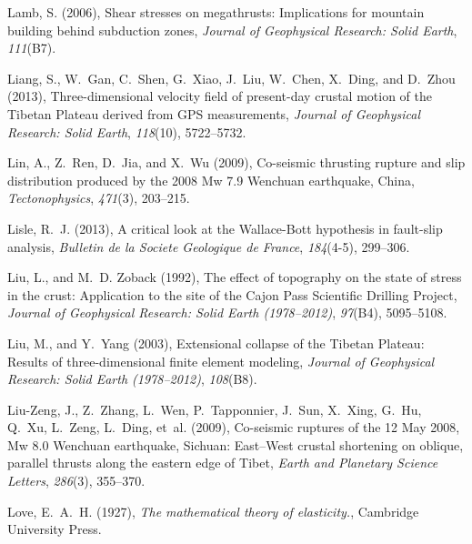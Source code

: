 \documentclass[draft,jgrga]{AGUTeX}
\begin{document}
\begin{article}
\begin{thebibliography}{90}
Lamb, S. (2006), Shear stresses on megathrusts: {I}mplications for mountain
  building behind subduction zones, \textit{Journal of Geophysical Research:
  Solid Earth}, \textit{111}(B7).

Liang, S., W.~Gan, C.~Shen, G.~Xiao, J.~Liu, W.~Chen, X.~Ding, and D.~Zhou
  (2013), Three-dimensional velocity field of present-day crustal motion of the
  {T}ibetan {P}lateau derived from {G}{P}{S} measurements, \textit{Journal of
  Geophysical Research: Solid Earth}, \textit{118}(10), 5722--5732.

Lin, A., Z.~Ren, D.~Jia, and X.~Wu (2009), Co-seismic thrusting rupture and
slip distribution produced by the 2008 {M}w 7.9 {W}enchuan
earthquake, {C}hina, \textit{Tectonophysics}, \textit{471}(3), 203--215.

Lisle, R.~J. (2013), A critical look at the {W}allace-{B}ott hypothesis in
  fault-slip analysis, \textit{Bulletin de la Societe Geologique de France},
  \textit{184}(4-5), 299--306.

Liu, L., and M.~D. Zoback (1992), The effect of topography on the state of
  stress in the crust: {A}pplication to the site of the {C}ajon {P}ass
  {S}cientific {D}rilling {P}roject, \textit{Journal of Geophysical Research:
  Solid Earth (1978--2012)}, \textit{97}(B4), 5095--5108.

Liu, M., and Y.~Yang (2003), Extensional collapse of the {T}ibetan {P}lateau:
  {R}esults of three-dimensional finite element modeling, \textit{Journal of
  Geophysical Research: Solid Earth (1978--2012)}, \textit{108}(B8).

Liu-Zeng, J., Z.~Zhang, L.~Wen, P.~Tapponnier, J.~Sun, X.~Xing, G.~Hu, Q.~Xu,
  L.~Zeng, L.~Ding, et~al. (2009), Co-seismic ruptures of the 12 {M}ay 2008, 
  {M}w 8.0 {W}enchuan earthquake, {S}ichuan: {E}ast--{W}est crustal
  shortening on oblique, parallel thrusts along the eastern edge of {T}ibet,
  \textit{Earth and Planetary Science Letters}, \textit{286}(3), 355--370.

Love, E.~A.~H. (1927), \textit{The mathematical theory of elasticity.},
  Cambridge University Press.


\end{thebibliography}
\end{article}
\end{document}
